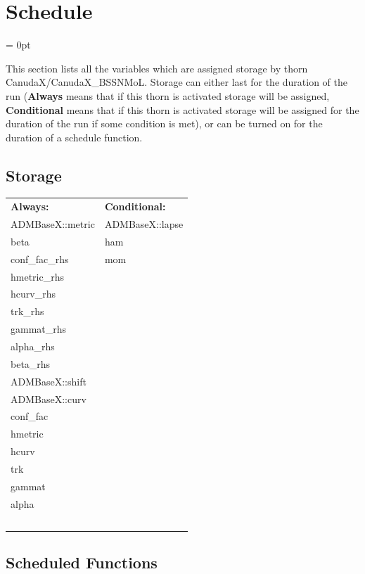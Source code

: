 
\section{Schedule} 


\parskip = 0pt


\noindent This section lists all the variables which are assigned storage by thorn CanudaX/CanudaX\_BSSNMoL.  Storage can either last for the duration of the run ({\bf Always} means that if this thorn is activated storage will be assigned, {\bf Conditional} means that if this thorn is activated storage will be assigned for the duration of the run if some condition is met), or can be turned on for the duration of a schedule function.


\subsection*{Storage}

\hspace{5mm}

 \begin{tabular*}{160mm}{ll} 

{\bf Always:}& {\bf Conditional:} \\ 
 ADMBaseX::metric &  ADMBaseX::lapse\\ 
 beta &  ham\\ 
 conf\_fac\_rhs &  mom\\ 
 hmetric\_rhs & ~\\ 
 hcurv\_rhs & ~\\ 
 trk\_rhs & ~\\ 
 gammat\_rhs & ~\\ 
 alpha\_rhs & ~\\ 
 beta\_rhs & ~\\ 
 ADMBaseX::shift & ~\\ 
 ADMBaseX::curv & ~\\ 
 conf\_fac & ~\\ 
 hmetric & ~\\ 
 hcurv & ~\\ 
 trk & ~\\ 
 gammat & ~\\ 
 alpha & ~\\ 
~ & ~\\ 
\end{tabular*} 


\subsection*{Scheduled Functions}
\vspace{5mm}


